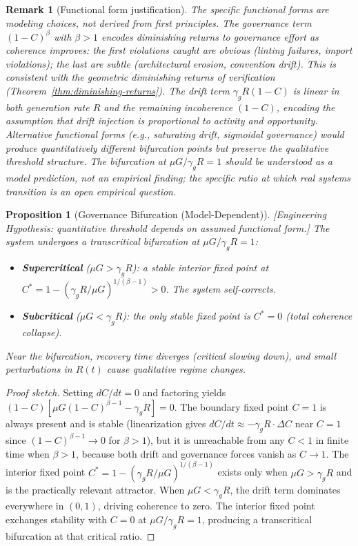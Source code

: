 \documentclass[11pt, a4paper]{googledeepmind}
\newtheorem{proposition}{Proposition}[section]
\newtheorem*{remark}{Remark}
\begin{document}
\begin{remark}[Functional form justification]
The specific functional forms are modeling choices, not derived from first principles. The governance term $(1-C)^\beta$ with $\beta > 1$ encodes diminishing returns to governance effort as coherence improves: the first violations caught are obvious (linting failures, import violations); the last are subtle (architectural erosion, convention drift). This is consistent with the geometric diminishing returns of verification (Theorem~\ref{thm:diminishing-returns}). The drift term $\gamma_g R(1-C)$ is linear in both generation rate $R$ and the remaining incoherence $(1-C)$, encoding the assumption that drift injection is proportional to activity and opportunity. Alternative functional forms (e.g., saturating drift, sigmoidal governance) would produce quantitatively different bifurcation points but preserve the qualitative threshold structure. The bifurcation at $\mu G / \gamma_g R = 1$ should be understood as a model prediction, not an empirical finding; the specific ratio at which real systems transition is an open empirical question.
\end{remark}

\begin{proposition}[Governance Bifurcation (Model-Dependent)]
\label{thm:bifurcation}
\emph{[Engineering Hypothesis: quantitative threshold depends on assumed functional form.]}
The system undergoes a transcritical bifurcation at $\mu G / \gamma_g R = 1$:
\begin{itemize}
    \item \textbf{Supercritical} ($\mu G > \gamma_g R$): a stable interior fixed point at $C^* = 1 - (\gamma_g R / \mu G)^{1/(\beta-1)} > 0$. The system self-corrects.
    \item \textbf{Subcritical} ($\mu G < \gamma_g R$): the only stable fixed point is $C^* = 0$ (total coherence collapse).
\end{itemize}
Near the bifurcation, recovery time diverges (critical slowing down), and small perturbations in $R(t)$ cause qualitative regime changes.
\end{proposition}

\begin{proof}[Proof sketch]
Setting $dC/dt = 0$ and factoring yields $(1 - C)[\mu G (1 - C)^{\beta - 1} - \gamma_g R] = 0$. The boundary fixed point $C = 1$ is always present and is stable (linearization gives $dC/dt \approx -\gamma_g R \cdot \Delta C$ near $C = 1$ since $(1-C)^{\beta-1} \to 0$ for $\beta > 1$), but it is unreachable from any $C < 1$ in finite time when $\beta > 1$, because both drift and governance forces vanish as $C \to 1$. The interior fixed point $C^* = 1 - (\gamma_g R / \mu G)^{1/(\beta - 1)}$ exists only when $\mu G > \gamma_g R$ and is the practically relevant attractor. When $\mu G < \gamma_g R$, the drift term dominates everywhere in $(0, 1)$, driving coherence to zero. The interior fixed point exchanges stability with $C = 0$ at $\mu G / \gamma_g R = 1$, producing a transcritical bifurcation at that critical ratio.
\end{proof}
\end{document}
